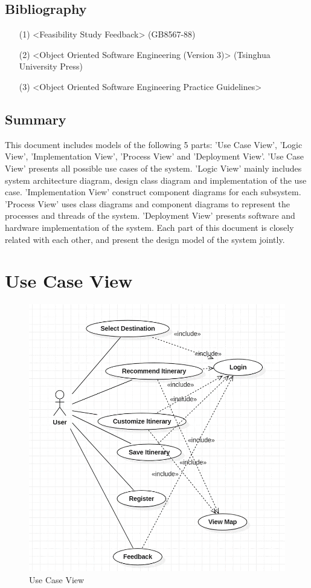 \documentclass[10pt]{article}
\begin{document}
\subsection{Bibliography}
\begin{itemize}
  \item[(1)] <Feasibility Study Feedback> (GB8567-88)
  \item[(2)] <Object Oriented Software Engineering (Version 3)> (Tsinghua University Press)
  \item[(3)] <Object Oriented Software Engineering Practice Guidelines>
\end{itemize}

\subsection{Summary}
This document includes models of the following 5 parts: 'Use Case View', 'Logic View', 'Implementation View', 'Process View' and 'Deployment View'. 'Use Case View' presents all possible use cases of the system. 'Logic View' mainly includes system architecture diagram, design class diagram and implementation of the use case. 'Implementation View' construct component diagrams for each subsystem. 'Process View' uses class diagrams and component diagrams to represent the processes and threads of the system. 'Deployment View' presents software and hardware implementation of the system. Each part of this document is closely related with each other, and present the design model of the system jointly.

\section{Use Case View}

\begin{figure}[H]
    \centering
    \includegraphics[width=14cm]{usecase.png}
    \caption{Use Case View}
    \label{Use Case View}
\end{figure}
\end{document}

